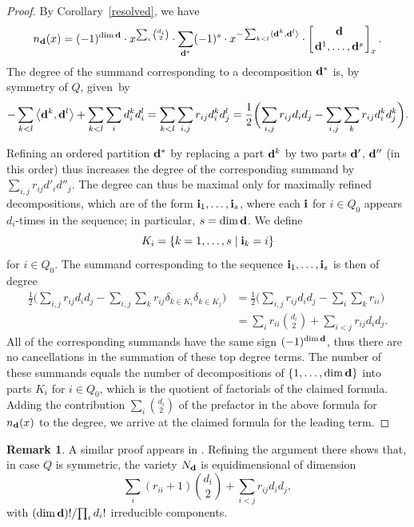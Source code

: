\documentclass[10pt,a4paper]{amsart}
\numberwithin{equation}{section}
\theoremstyle{definition}
\newtheorem{Remark}[Theorem]{Remark}
\begin{document}
\begin{proof} By Corollary~\ref{resolved}, we have
\[n_{\bf d}(x)=(-1)^{\dim {\bf d}}\cdot{x}^{\sum_i{d_i\choose 2}}\cdot\sum_{{\bf d}^*}(-1)^s\cdot{x}^{-\sum_{k<l}\langle{\bf d}^k,{\bf d}^l\rangle}\cdot\left[{{\bf d}\atop{{\bf d}^1,\dots,{\bf d}^s}}\right]_{x}.\]
The degree of the summand corresponding to a decomposition ${\bf d}^*$ is, by symmetry of $Q$, given~by
\[-\sum_{k<l}\big\langle{\bf d}^k,{\bf d}^l\big\rangle+\sum_{k<l}\sum_id^k_id^l_i=\sum_{k<l}\sum_{i,j}r_{ij}d^k_id^l_j=\frac{1}{2} \biggl(\sum_{i,j}r_{ij}d_id_j-\sum_{i,j}\sum_kr_{ij}d^k_id^k_j\biggr).\]

Refining an ordered partition ${\bf d}^*$ by replacing a part ${\bf d}^k$ by two parts ${\bf d}'$, ${\bf d}''$ (in this order) thus increases the degree of the corresponding summand by $\sum_{i,j}r_{ij}d'_id''_j$. The degree can thus be maximal only for maximally refined decompositions, which are of the form ${\bf i}_1,\dots,{\bf i}_s$, where each ${\bf i}$ for $i\in Q_0$ appears $d_i$-times in the sequence; in particular, $s=\dim {\bf d}$. We define \[K_i=\{k=1,\dots,s \mid {\bf i}_k=i\}\] for $i\in Q_0$. The summand corresponding to the sequence ${\bf i}_1,\dots,{\bf i}_s$ is then of degree
\begin{align*}
\frac{1}{2}\biggl(\sum_{i,j}r_{ij}d_id_j-\sum_{i,j}\sum_kr_{ij}\delta_{k\in K_i}\delta_{k\in K_j}\biggr)
&=\frac{1}{2}\biggl(\sum_{i,j}r_{ij}d_id_j-\sum_i\sum_kr_{ii}\biggr)\\
&=\sum_ir_{ii}{d_i\choose 2}+\sum_{i<j}r_{ij}d_id_j.\end{align*}
All of the corresponding summands have the same sign $(-1)^{\dim {\bf d}}$, thus there are no cancellations in the summation of these top degree terms. The number of these summands equals the number of decompositions of $\{1,\dots,\dim{\bf d}\}$ into parts $K_i$ for $i\in Q_0$, which is the quotient of factorials of the claimed formula. Adding the contribution $\sum_i{d_i\choose 2}$ of the prefactor in the above formula for $n_{\bf d}(x)$ to the degree, we arrive at the claimed formula for the leading term.\end{proof}

\begin{Remark}
A similar proof appears in \cite[Theorem~4.1]{RSmall}. Refining the argument there shows that, in case $Q$ is symmetric, the variety $N_{\bf d}$ is equidimensional of dimension
\[\sum _{i}(r_{ii}+1){d_i\choose 2}+\sum_{i<j}r_{ij}d_id_j,\]
with ${(\dim{\bf d})!}/{\prod_id_i!}$
irreducible components.
\end{Remark}
\end{document}
